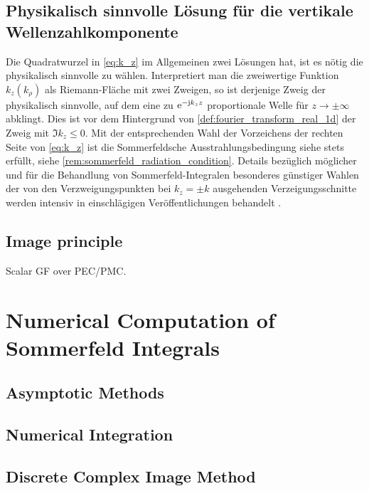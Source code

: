 \subsection{Physikalisch sinnvolle Lösung für die vertikale Wellenzahlkomponente}
\begin{remark}
	Die Quadratwurzel in \eqref{eq:k_z} im Allgemeinen zwei Lösungen hat, ist es nötig die physikalisch sinnvolle zu wählen. Interpretiert man die zweiwertige Funktion $k_z \left(k_\rho\right)$ als Riemann-Fläche mit zwei Zweigen, so ist derjenige Zweig der physikalisch sinnvolle, auf dem eine zu $\mathrm{e}^{-\mathrm{j} k_z z}$ proportionale Welle für $z \rightarrow \pm\infty$ abklingt. Dies ist vor dem Hintergrund von \cref{def:fourier_transform_real_1d} der Zweig mit $\Im{k_z} \leq 0$. Mit der entsprechenden Wahl der Vorzeichens der rechten Seite von \eqref{eq:k_z} ist die Sommerfeldsche Ausstrahlungsbedingung siehe stets erfüllt, siehe \cref{rem:sommerfeld_radiation_condition}. Details bezüglich möglicher und für die Behandlung von Sommerfeld-Integralen besonderes günstiger Wahlen der von den Verzweigungspunkten bei $k_z = \pm k$ ausgehenden Verzeigungsschnitte werden intensiv in einschlägigen Veröffentlichungen behandelt \cite{Sommerfeld1964,Chew1999,Michalski2016b}.
\end{remark}

\subsection{Image principle}

Scalar GF over PEC/PMC. \cite[p. 250]{Sommerfeld1964}


\section{Numerical Computation of Sommerfeld Integrals}

\subsection{Asymptotic Methods}

\subsection{Numerical Integration}

\subsection{Discrete Complex Image Method}


